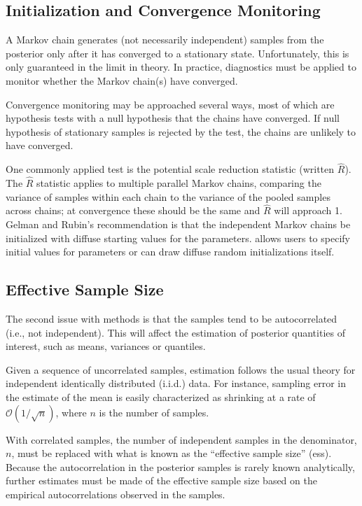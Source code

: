 \subsection{Initialization and Convergence Monitoring}

A Markov chain generates (not necessarily independent) samples from
the posterior only after it has converged to a stationary state.
Unfortunately, this is only guaranteed in the limit in theory.  In
practice, diagnostics must be applied to monitor whether the Markov chain(s)
have converged.

Convergence monitoring may be approached several ways, most of which
are hypothesis tests with a null hypothesis that the chains have
converged.  If null hypothesis of stationary samples is rejected by
the test, the chains are unlikely to have converged. 

One commonly applied test is the \cite{GelmanRubin:1992} potential
scale reduction statistic (written $\hat{R}$).  The $\hat{R}$
statistic applies to multiple parallel Markov chains, comparing the
variance of samples within each chain to the variance of the pooled
samples across chains; at convergence these should be the same and
$\hat{R}$ will approach 1.  Gelman and Rubin's recommendation is that
the independent Markov chains be initialized with diffuse starting
values for the parameters.  \Stan allows users to specify initial
values for parameters or can draw diffuse random initializations
itself.

\subsection{Effective Sample Size}

The second issue with \MCMC methods is that the samples tend to be
autocorrelated (i.e., not independent).  This will affect the
estimation of posterior quantities of interest, such as means,
variances or quantiles.

Given a sequence of uncorrelated samples, estimation follows the usual
theory for independent identically distributed (i.i.d.) data.  For
instance, sampling error in the estimate of the mean is easily
characterized as shrinking at a rate of ${\mathcal O}(1/\sqrt{n})$,
where $n$ is the number of samples.

With correlated samples, the number of independent samples in the
denominator, $n$, must be replaced with what is known as the
``effective sample size'' ({\sc ess}).  Because the autocorrelation in
the posterior samples is rarely known analytically, further estimates
must be made of the effective sample size based on the empirical
autocorrelations observed in the samples.  


